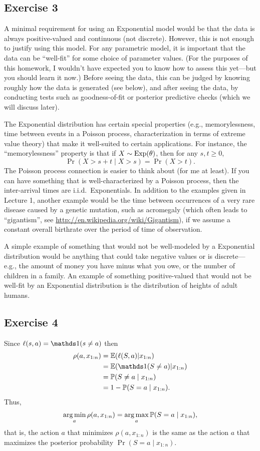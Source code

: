 \documentclass[12pt]{article}
\begin{document}
\subsection*{Exercise 3}

A minimal requirement for using an Exponential model would be that the data is always positive-valued and continuous (not discrete). However, this is not enough to justify using this model. For any parametric model, it is important that the data can be ``well-fit'' for some choice of parameter values. (For the purposes of this homework, I wouldn't have expected you to know how to assess this yet---but you should learn it now.) Before seeing the data, this can be judged by knowing roughly how the data is generated (see below), and after seeing the data, by conducting tests such as goodness-of-fit or posterior predictive checks (which we will discuss later).

The Exponential distribution has certain special properties (e.g., memorylessness, time between events in a Poisson process, characterization in terms of extreme value theory) that make it well-suited to certain applications. For instance, the ``memorylessness'' property is that if $X\sim\operatorname*{Exp}(\theta)$, then for any $s,t\geq 0$,
$$\Pr(X>s+t \mid X>s) = \Pr(X>t).$$
The Poisson process connection is easier to think about (for me at least). If you can have something that is well-characterized by a Poisson process, then the inter-arrival times are i.i.d.\ Exponentials.
In addition to the examples given in Lecture 1, another example would be the time between occurrences of a very rare disease caused by a genetic mutation, such as acromegaly (which often leads to ``gigantism'', see \url{http://en.wikipedia.org/wiki/Gigantism}), if we assume a constant overall birthrate over the period of time of observation.

A simple example of something that would not be well-modeled by a Exponential distribution would be anything that could take negative values or is discrete---e.g., the amount of money you have minus what you owe, or the number of children in a family. An example of something positive-valued that would not be well-fit by an Exponential distribution is the distribution of heights of adult humans.



\subsection*{Exercise 4}

Since $\ell(s,a) =\I(s\neq a)$ then
\begin{align*}
\rho(a,x_{1:n}) & =\E(\ell(S,a)|x_{1:n})\\
& =\E(\I(S\neq a)|x_{1:n})\\
& =\Pr(S\neq a\mid x_{1:n})\\
& =1 - \Pr(S = a\mid x_{1:n}).
\end{align*}
Thus,
$$\operatorname*{arg\,min}_a \rho(a,x_{1:n}) = \operatorname*{arg\,max}_a \mathbb{P}(S = a\mid x_{1:n}),$$
that is, the action $a$ that minimizes $\rho(a,x_{1:n})$ is the same as the action $a$ that maximizes the posterior probability $\Pr(S = a\mid x_{1:n})$.
\end{document}
